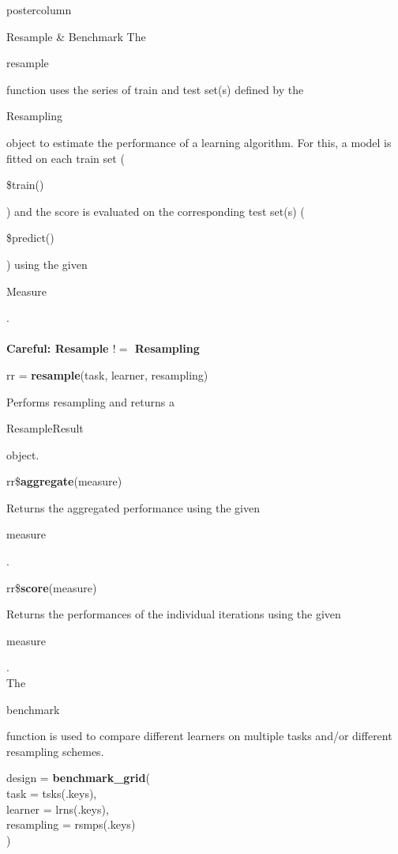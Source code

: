 \documentclass{beamer}
\newcommand{\codeinline}[1]{\begin{codeboxinline}#1\end{codeboxinline}}
\begin{document}
\begin{frame}[fragile]{}
\begin{columns}
\begin{column}{.245\textwidth}
\begin{beamercolorbox}[center]{postercolumn}
\begin{minipage}{.98\textwidth}
{						\begin{myblock}{Resample \& Benchmark}
							The \codeinline{resample} function uses the series
							of train and test set(s) defined by the
							\codeinline{Resampling} object to estimate the
							performance of a learning algorithm. For this, a
							model is fitted on each train set
							(\codeinline{\$train()}) and the score is evaluated
							on the corresponding test set(s)
							(\codeinline{\$predict()}) using the given
							\codeinline{Measure}.
							\\
							\\
							\textbf{Careful: Resample $!=$ Resampling}
							\vspace{1em}
							\\
							\begin{codebox}
								rr = \textbf{resample}(task, learner, resampling)
							\end{codebox}
							Performs resampling and returns a \codeinline{ResampleResult} object.
							\\
							\vspace{1em}
							\begin{codebox}
								rr\$\textbf{aggregate}(measure)
							\end{codebox}
							Returns the aggregated performance using the given \codeinline{measure}.
							\\
							\begin{codebox}
								rr\$\textbf{score}(measure)
							\end{codebox}
							Returns the performances of the individual iterations using the given \codeinline{measure}.
							\vspace{2em}
							\\
							The \codeinline{benchmark} function is used to compare different learners on multiple tasks and/or different resampling schemes.
							\\
							\begin{codeboxmultiline}[width=21.95cm]
								design = \textbf{benchmark\_grid}(\\
								\hspace*{1ex}task = tsks(.keys),\\
								\hspace*{1ex}learner = lrns(.keys),\\
								\hspace*{1ex}resampling = rsmps(.keys)\\
								)
							\end{codeboxmultiline}

\end{myblock}}
\end{minipage}
\end{beamercolorbox}
\end{column}
\end{columns}
\end{frame}
\end{document}
